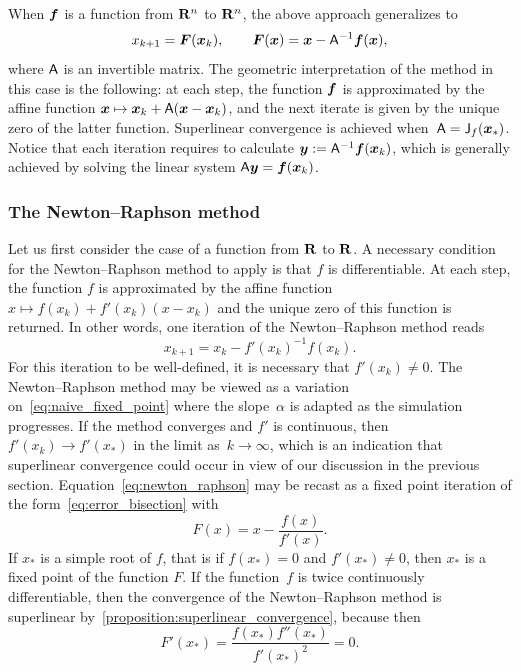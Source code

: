 When $\mathbf{\boldsymbol{f}}$ is a function from $\mathbf R^n$ to $\mathbf R^n$,
the above approach generalizes to
\[
    x_{k+1} = \mathbf{\boldsymbol{F}}(\mathbf{\boldsymbol{x}}_k), \qquad
    \mathbf{\boldsymbol{F}}(\mathbf{\boldsymbol{x}}) = \mathbf{\boldsymbol{x}} - \mathsf A^{-1} \mathbf{\boldsymbol{f}}(\mathbf{\boldsymbol{x}}),
\]
where $\mathsf A$ is an invertible matrix.
The geometric interpretation of the method in this case is the following:
at each step, the function $\mathbf{\boldsymbol{f}}$ is approximated by the affine function
$\mathbf{\boldsymbol{x}} \mapsto \mathbf{\boldsymbol{x}}_k + \mathsf A(\mathbf{\boldsymbol{x}} - \mathbf{\boldsymbol{x}}_k)$,
and the next iterate is given by the unique zero of the latter function.
Superlinear convergence is achieved when~$\mathsf A = \mathsf J_f(\mathbf{\boldsymbol{x}}_*)$.
Notice that each iteration requires to calculate $\mathbf{\boldsymbol{y}} := \mathsf A^{-1} \mathbf{\boldsymbol{f}}(\mathbf{\boldsymbol{x}}_k)$,
which is generally achieved by solving the linear system $\mathsf A \mathbf{\boldsymbol{y}} = \mathbf{\boldsymbol{f}}(\mathbf{\boldsymbol{x}}_k)$.

\subsubsection{The Newton--Raphson method}
\label{sub:newton_raphson}
Let us first consider the case of a function from $\mathbf R$ to $\mathbf R$.
A necessary condition for the Newton--Raphson method to apply is that $f$ is differentiable.
At each step, the function $f$ is approximated by the affine function
$x \mapsto f(x_k) + f'(x_k) (x - x_k)$ and the unique zero of this function is returned.
In other words, one iteration of the Newton--Raphson method reads
\begin{equation}
    \label{eq:newton_raphson}
    x_{k+1} = x_k - f'(x_k)^{-1} f(x_k).
\end{equation}
For this iteration to be well-defined,
it is necessary that $f'(x_k) \neq 0$.
The Newton--Raphson method may be viewed as a variation on~\eqref{eq:naive_fixed_point} where the slope~$\alpha$ is adapted as the simulation progresses.
If the method converges and $f'$ is continuous,
then $f'(x_k) \to f'(x_*)$ in the limit as~$k \to \infty$,
which is an indication that superlinear convergence could occur in view of our discussion in the previous section.
Equation~\eqref{eq:newton_raphson} may be recast as a fixed point iteration of the form~\eqref{eq:error_bisection} with
\[
    F(x) = x - \frac{f(x)}{f'(x)}.
\]
If $x_*$ is a simple root of $f$, that is if $f(x_*) = 0$ and $f'(x_*) \neq 0$,
then $x_*$ is a fixed point of the function $F$.
If the function~$f$ is twice continuously differentiable,
then the convergence of the Newton--Raphson method is superlinear by~\cref{proposition:superlinear_convergence},
because then
\[
    F'(x_*) = \frac{f(x_*) f''(x_*)}{f'(x_*)^2} = 0.
\]
